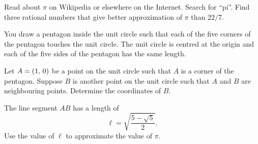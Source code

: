 \documentclass[a4paper,oneside,12pt]{article}
\begin{document}
\begin{problem}
\item Read about $\pi$ on Wikipedia or elsewhere on the Internet.
  Search for ``pi''.  Find three rational numbers that give better
  approximation of $\pi$ than $22 / 7$.

\item You draw a pentagon inside the unit circle such that each of the
  five corners of the pentagon touches the unit circle.  The unit
  circle is centred at the origin and each of the five sides of the
  pentagon has the same length.
  \begin{packedenum}
  \item\label{subprob:inscribed_pentagon_B_coordinates}
    Let $A = \left\lparen{1},\, {0}\right\rparen$ be a point on the unit circle such that $A$
    is a corner of the pentagon.  Suppose $B$ is another point on the
    unit circle such that $A$ and $B$ are neighbouring points.
    Determine the coordinates of $B$.

  \item\label{subprob:inscribed_pentagon_approximate_pi}
    The line segment $AB$ has a length of
    \[
    \ell
    =
    \sqrt{
      \frac{5 - \sqrt{5}}{2}
    }.
    \]
    Use the value of $\ell$ to approximate the value of $\pi$.
  \end{packedenum}


\end{problem}
\end{document}
